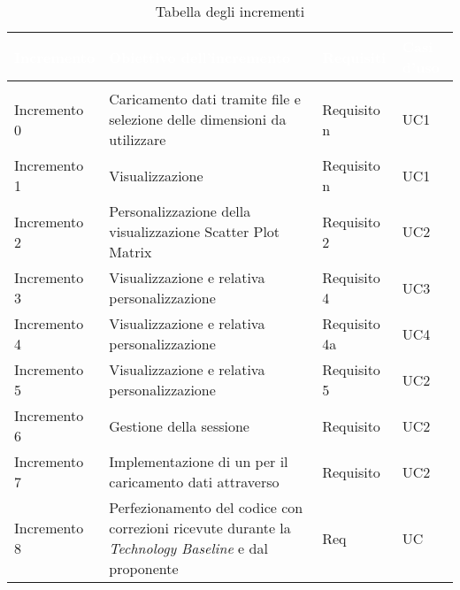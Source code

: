 \begin{longtable}{C{3cm} C{7cm} C{2cm} C{2cm}}
\textcolor{white}{\textbf{Incremento}} & 
\textcolor{white}{\textbf{Obiettivo dell'incremento}} & 
\textcolor{white}{\textbf{Requisiti}} &
\textcolor{white}{\textbf{Casi d'uso}}\\
\endfirsthead
{}\\
\endfoot
{}\caption{Tabella degli incrementi}
\endlastfoot

Incremento 0 & Caricamento dati tramite file e selezione delle dimensioni da utilizzare & Requisito n & UC1\\
Incremento 1 & Visualizzazione  & Requisito n & UC1 \\
Incremento 2 & Personalizzazione della visualizzazione Scatter Plot Matrix & Requisito 2 & UC2\\
Incremento 3 & Visualizzazione  e relativa personalizzazione & Requisito 4 & UC3\\
Incremento 4 & Visualizzazione  e relativa personalizzazione & Requisito 4a & UC4\\
Incremento 5 & Visualizzazione  e relativa personalizzazione & Requisito 5 & UC2\\
Incremento 6 & Gestione della sessione & Requisito & UC2\\
Incremento 7 & Implementazione di un  per il caricamento dati attraverso  & Requisito & UC2\\
Incremento 8 & Perfezionamento del codice con correzioni ricevute durante la \textit{Technology
Baseline} e dal proponente & Req & UC \\
\end{longtable}
